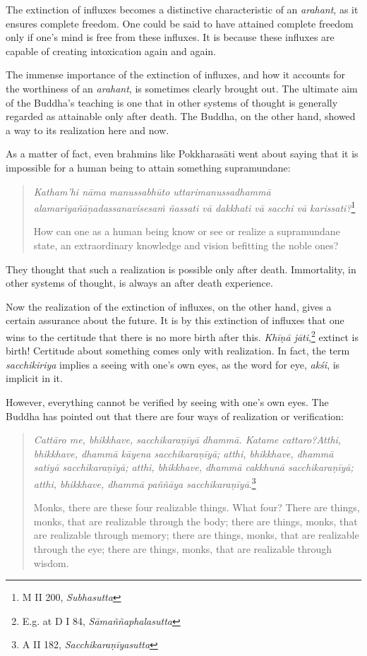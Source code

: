 The extinction of influxes becomes a distinctive characteristic of an \emph{arahant}, as it ensures complete freedom. One could be said to have attained complete freedom only if one's mind is free from these influxes. It is because these influxes are capable of creating intoxication again and again.

The immense importance of the extinction of influxes, and how it accounts for the worthiness of an \emph{arahant}, is sometimes clearly brought out. The ultimate aim of the Buddha's teaching is one that in other systems of thought is generally regarded as attainable only after death. The Buddha, on the other hand, showed a way to its realization here and now.

As a matter of fact, even brahmins like Pokkharasāti went about saying that it is impossible for a human being to attain something supramundane:

\begin{quote}
\emph{Katham'hi nāma manussabhūto uttarimanussadhammā alamariyañāṇadassanavisesaṁ ñassati vā dakkhati vā sacchi vā karissati?}\footnote{M II 200, \emph{Subhasutta}}

How can one as a human being know or see or realize a supramundane state, an extraordinary knowledge and vision befitting the noble ones?
\end{quote}

They thought that such a realization is possible only after death. Immortality, in other systems of thought, is always an after death experience.

Now the realization of the extinction of influxes, on the other hand, gives a certain assurance about the future. It is by this extinction of influxes that one wins to the certitude that there is no more birth after this. \emph{Khīṇā jāti},\footnote{E.g. at D I 84, \emph{Sāmaññaphalasutta}} extinct is birth! Certitude about something comes only with realization. In fact, the term \emph{sacchikiriya} implies a seeing with one's own eyes, as the word for eye, \emph{akśi}, is implicit in it.

However, everything cannot be verified by seeing with one's own eyes. The Buddha has pointed out that there are four ways of realization or verification:

\begin{quote}
\emph{Cattāro me, bhikkhave, sacchikaraṇīyā dhammā. Katame cattaro?Atthi, bhikkhave, dhammā kāyena sacchikaraṇīyā; atthi, bhikkhave, dhammā satiyā sacchikaraṇīyā; atthi, bhikkhave, dhammā cakkhunā sacchikaraṇīyā; atthi, bhikkhave, dhammā paññāya sacchikaraṇīyā}.\footnote{A II 182, \emph{Sacchikaraṇīyasutta}}

Monks, there are these four realizable things. What four? There are things, monks, that are realizable through the body; there are things, monks, that are realizable through memory; there are things, monks, that are realizable through the eye; there are things, monks, that are realizable through wisdom.
\end{quote}

